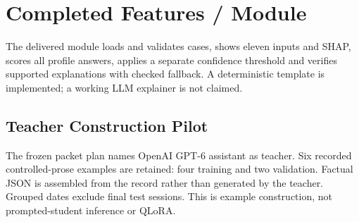 \section{Completed Features / Module}
The delivered module loads and validates cases, shows eleven inputs and SHAP, scores all profile answers, applies a separate confidence threshold and verifies supported explanations with checked fallback. A deterministic template is implemented; a working LLM explainer is not claimed.
\subsection{Teacher Construction Pilot}
\label{sec:teacher-pilot}
The frozen packet plan names OpenAI GPT-6 assistant as teacher. Six recorded controlled-prose examples are retained: four training and two validation. Factual JSON is assembled from the record rather than generated by the teacher. Grouped dates exclude final test sessions. This is example construction, not prompted-student inference or QLoRA.

